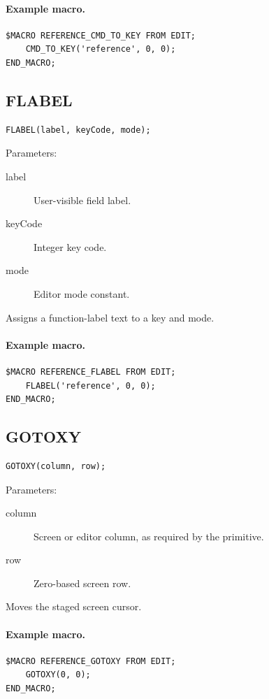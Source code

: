 \documentclass[a4paper,10pt,twoside,openany]{book}
\begin{document}
\paragraph{Example macro.}
\begin{verbatim}
$MACRO REFERENCE_CMD_TO_KEY FROM EDIT;
    CMD_TO_KEY('reference', 0, 0);
END_MACRO;
\end{verbatim}

\label{prim:procedure-flabel}
\subsection*{FLABEL}
\begin{verbatim}
FLABEL(label, keyCode, mode);
\end{verbatim}
Parameters:
\begin{description}
\item[label] User-visible field label.
\item[keyCode] Integer key code.
\item[mode] Editor mode constant.
\end{description}

Assigns a function-label text to a key and mode.

\paragraph{Example macro.}
\begin{verbatim}
$MACRO REFERENCE_FLABEL FROM EDIT;
    FLABEL('reference', 0, 0);
END_MACRO;
\end{verbatim}

\label{prim:procedure-gotoxy}
\subsection*{GOTOXY}
\begin{verbatim}
GOTOXY(column, row);
\end{verbatim}
Parameters:
\begin{description}
\item[column] Screen or editor column, as required by the primitive.
\item[row] Zero-based screen row.
\end{description}

Moves the staged screen cursor.

\paragraph{Example macro.}
\begin{verbatim}
$MACRO REFERENCE_GOTOXY FROM EDIT;
    GOTOXY(0, 0);
END_MACRO;
\end{verbatim}
\end{document}
